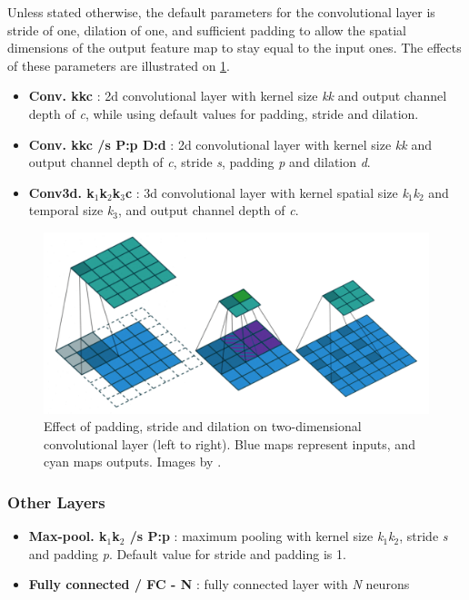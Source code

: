 Unless stated otherwise, the default parameters for the convolutional layer is stride of one, dilation of one, and sufficient padding to allow the spatial dimensions of the output feature map to stay equal to the input ones. The effects of these parameters are illustrated on \cref{fig:convolutions}.

\begin{itemize}
    \item \textbf{Conv. k\x k\x c} : 2d convolutional layer with kernel size \textit{k\x k} and output channel depth of \textit{c}, while using default values for padding, stride and dilation.
    
    \item \textbf{Conv. k\x k\x c /s P:p D:d} : 2d convolutional layer with kernel size \textit{k\x k} and output channel depth of \textit{c}, stride \textit{s}, padding \textit{p} and dilation \textit{d}. 
    
    \item \textbf{Conv3d. k$_1$\x k$_2$\x k$_3$\x c} : 3d convolutional layer with kernel spatial size \textit{k$_1$\x k$_2$} and temporal size \textit{k$_3$}, and output channel depth of \textit{c}. 
\end{itemize}

\begin{figure}
    \centering
    \includegraphics[width=\textwidth]{img/convolutions}
    \caption[Parametrization of convolutional layer]{Effect of padding, stride and dilation on two-dimensional convolutional layer (left to right). Blue maps represent inputs, and cyan maps outputs. Images by \citet{bib:convolution}.}
    \label{fig:convolutions}
\end{figure}

\subsubsection*{Other Layers}
\begin{itemize}
    \item \textbf{Max-pool. k$_1$\x k$_2$ /s P:p} : maximum pooling with kernel size \textit{k$_1$\x k$_2$}, stride \textit{s} and padding \textit{p}. Default value for stride and padding is 1.
    
    \item \textbf{Fully connected / FC - N} : fully connected layer with \textit{N} neurons
\end{itemize}
